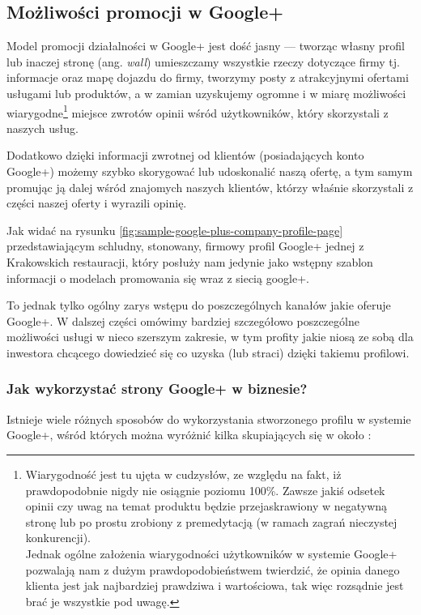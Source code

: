 \subsection{Możliwości promocji w Google+}
Model promocji działalności w Google+ jest dość jasny --- tworząc własny profil lub inaczej stronę (ang. \textit{wall}) umieszczamy wszystkie rzeczy dotyczące firmy tj. informacje oraz mapę dojazdu do firmy, tworzymy posty z atrakcyjnymi ofertami usługami lub produktów, a w zamian uzyskujemy ogromne i w miarę możliwości wiarygodne\footnote{Wiarygodność jest tu ujęta w cudzysłów, ze względu na fakt, iż prawdopodobnie nigdy nie osiągnie poziomu 100\%. Zawsze jakiś odsetek opinii czy uwag na temat produktu będzie przejaskrawiony w negatywną stronę lub po prostu zrobiony z premedytacją (w ramach zagrań nieczystej konkurencji).\\ Jednak ogólne założenia wiarygodności użytkowników w systemie Google+ pozwalają nam z dużym prawdopodobieństwem twierdzić, że opinia danego klienta jest jak najbardziej prawdziwa i wartościowa, tak więc rozsądnie jest brać je wszystkie pod uwagę.} miejsce zwrotów opinii wśród użytkowników, który skorzystali z naszych usług. 

\noindent Dodatkowo dzięki informacji zwrotnej od klientów (posiadających konto Google+) możemy szybko skorygować lub udoskonalić naszą ofertę, a tym samym promując ją dalej wśród znajomych naszych klientów, którzy właśnie skorzystali z części naszej oferty i wyrazili opinię. 

Jak widać na rysunku \ref{fig:sample-google-plus-company-profile-page} przedstawiającym schludny, stonowany, firmowy profil Google+ jednej z Krakowskich restauracji, który posłuży nam jedynie jako wstępny szablon informacji o modelach promowania się wraz z siecią google+.

To jednak tylko ogólny zarys wstępu do poszczególnych kanałów jakie oferuje Google+. W dalszej części omówimy bardziej szczegółowo poszczególne możliwości usługi w nieco szerszym zakresie, w tym profity jakie niosą ze sobą dla inwestora chcącego dowiedzieć się co uzyska (lub straci) dzięki takiemu profilowi.



\subsubsection{Jak wykorzystać strony Google+ w biznesie?}
Istnieje wiele różnych sposobów do wykorzystania stworzonego profilu w systemie Google+, wśród których można wyróżnić kilka skupiających się w około \cite[s.119]{Brogan12}:


